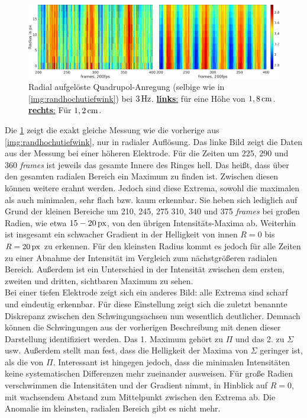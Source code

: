 \documentclass[numbers=noenddot,a4paper]{scrartcl}
\newcommand{\tilt}[1]{\textit{#1}}
\newcommand{\fett}[1]{\textbf{#1}}
\begin{document}
				\begin{figure}[!b]
					\centering
					\includegraphics[width=\textwidth,height=0.35\textwidth]{figs/auswertung/randhochutiefquad3Hz1sekrad.png}
					\caption{Radial aufgelöste Quadrupol-Anregung (selbige wie in \ref{img:randhochutiefwink}) bei $\unit[3]{Hz}$. \underline{\fett{links}:} für eine Höhe von $\unit[1,8]{cm}$. \underline{\fett{rechts}:} Für $\unit[1,2]{cm}$.}
					\label{img:randhochutiefrad}
				\end{figure}

			Die \ref{img:randhochutiefrad} zeigt die exakt gleiche Messung wie die vorherige aus \ref{img:randhochutiefwink}, nur in radialer Auflösung. Das linke Bild zeigt die Daten aus der Messung bei einer höheren Elektrode. Für die Zeiten um 225, 290 und 360 \tilt{frames} ist jeweils das gesamte Innere des Ringes hell. Das heißt, dass über den gesamten radialen Bereich ein Maximum zu finden ist. Zwischen diesen können weitere erahnt werden. Jedoch sind diese Extrema, sowohl die maximalen als auch minimalen, sehr flach bzw. kaum erkennbar. Sie heben sich lediglich auf Grund der kleinen Bereiche um 210, 245, 275 310, 340 und 375 \tilt{frames} bei großen Radien, wie etwa $\unit[15-20]{px}$, von den übrigen Intensitäts-Maxima ab. Weiterhin ist insgesamt ein schwacher Gradient in der Helligkeit von innen $R=0$ bis $R=\unit[20]{px}$ zu erkennen. Für den kleinsten Radius kommt es jedoch für alle Zeiten zu einer Abnahme der Intensität im Vergleich zum nächstgrößeren radialen Bereich. Außerdem ist ein Unterschied in der Intensität zwischen dem ersten, zweiten und dritten, sichtbaren Maximum zu sehen.\\
			Bei einer tiefen Elektrode zeigt sich ein anderes Bild: alle Extrema sind scharf und eindeutig erkennbar. Für diese Einstellung zeigt sich die zuletzt benannte Diskrepanz zwischen den Schwingungsachsen nun wesentlich deutlicher. Demnach können die Schwingungen aus der vorherigen Beschreibung mit denen dieser Darstellung identifiziert werden. Das 1. Maximum gehört zu $\Pi$ und das 2. zu $\Sigma$ usw. Außerdem stellt man fest, dass die Helligkeit der Maxima von $\Sigma$ geringer ist, als die von $\Pi$. Interessant ist hingegen jedoch, dass die minimalen Intensitäten keine systematischen Differenzen mehr zueinander ausweisen. Für große Radien verschwimmen die Intensitäten und der Gradient nimmt, in Hinblick auf $R=0$, mit wachsendem Abstand zum Mittelpunkt zwischen den Extrema ab. Die Anomalie im kleinsten, radialen Bereich gibt es nicht mehr.
\end{document}
